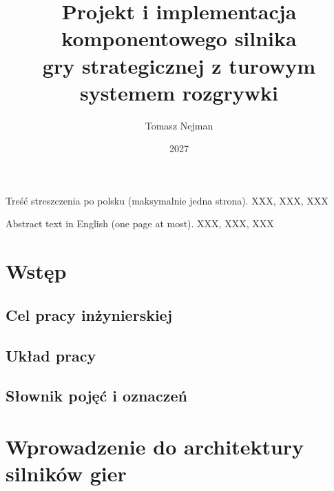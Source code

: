\documentclass[
    bindingoffset=5mm,
    footnoteindent=3mm,
    hyphenation=true
]{src/wut-thesis}
\begin{document}
\title{
    Projekt i implementacja komponentowego silnika \\
    gry strategicznej z turowym systemem rozgrywki
}
\author{Tomasz Nejman}
\date{2027}
\maketitle

\clearpage
\pagestyle{plain}
\begin{singlespace}
    \abstract Treść streszczenia po polsku (maksymalnie jedna strona).
    \keywords XXX, XXX, XXX
\end{singlespace}

\clearpage
\begin{singlespace}
    \secondabstract Abstract text in English (one page at most).
    \secondkeywords XXX, XXX, XXX
\end{singlespace}

\clearpage
\makeauthorship

\clearpage
\makelicense

\clearpage
\tableofcontents

\clearpage
\pagestyle{headings}

\section{Wstęp}

\subsection{Cel pracy inżynierskiej}

\subsection{Układ pracy}

\subsection{Słownik pojęć i oznaczeń}

\clearpage
\section{Wprowadzenie do architektury silników gier}
\end{document}
